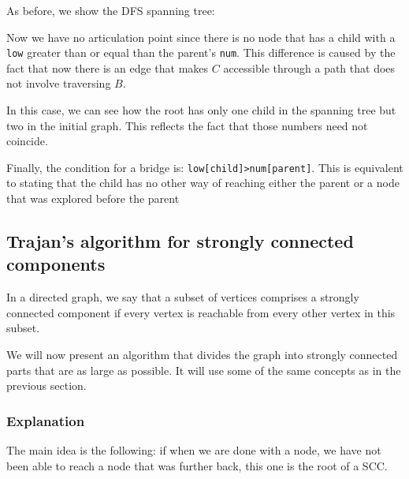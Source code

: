\documentclass[12pt]{report}
\begin{document}
As before, we show the DFS spanning tree:
\begin{figure}[h!]
\centering
{}
\end{figure}

Now we have no articulation point since there is no node that has a child
with a \texttt{low} greater than or equal  than the parent's \texttt{num}. 
This difference is caused by the fact that now there is an edge that makes $C$
accessible through a path that does not involve traversing $B$.

In this case, we can see how the root has only one child in the spanning tree
but two in the initial graph. This reflects the fact that those numbers need not
coincide.

Finally, the condition for a bridge is: \texttt{low[child]>num[parent]}. This is 
equivalent to  stating that the child has no other way of reaching either the
parent or a node that was explored before the parent

\subsection{Trajan's algorithm for strongly connected components}
In a directed graph, we say that a subset of vertices comprises a strongly 
connected component if every vertex is reachable from every other vertex in
this subset.

We will now present an algorithm that divides the graph into strongly
connected parts that are as large as possible. It will use some of the 
same concepts as in the previous section. 
\subsubsection*{Explanation}
The main idea is the following: if when we are done with a node, we have not been
able to reach a node that was further back, this one is the root of a SCC. 
\end{document}
